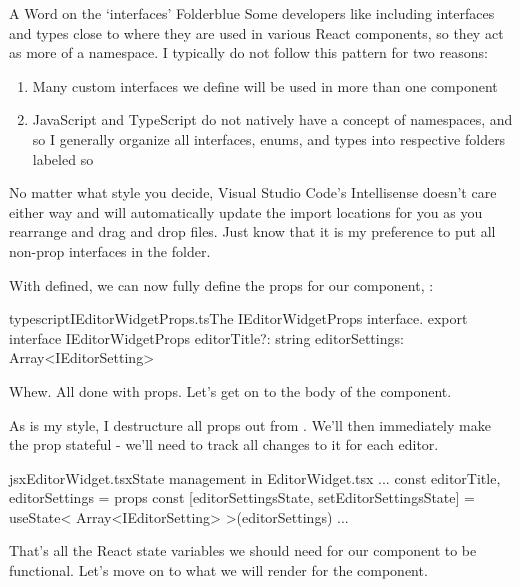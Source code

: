 \documentclass[paper=6in:9in,pagesize=pdftex,headinclude=on,footinclude=on,12pt,twoside]{scrbook}
\begin{document}
\begin{highlightBox}{A Word on the `interfaces' Folder}{blue}{\information}
Some developers like including interfaces and types close to where they are used in various React components, so they act as more of a namespace. I typically do not follow this pattern for two reasons:

\begin{enumerate}
  \item Many custom interfaces we define will be used in more than one component
  \item JavaScript and TypeScript do not natively have a concept of namespaces, and so I generally organize all interfaces, enums, and types into respective folders labeled so
\end{enumerate}

No matter what style you decide, Visual Studio Code's Intellisense doesn't care either way and will automatically update the import locations for you as you rearrange and drag and drop files. Just know that it is my preference to put all non-prop interfaces in the  folder.
\end{highlightBox}

With  defined, we can now fully define the props for our component, :

\begin{codeInput}{typescript}{IEditorWidgetProps.ts}{The IEditorWidgetProps interface.}
export interface IEditorWidgetProps {
  editorTitle?: string
  editorSettings: Array<IEditorSetting>
}
\end{codeInput}

Whew. All done with props. Let's get on to the body of the component.


As is my style, I destructure all props out from . We'll then immediately make the  prop stateful - we'll need to track all changes to it for each editor.

\begin{codeInput}{jsx}{EditorWidget.tsx}{State management in EditorWidget.tsx}
...
const { editorTitle, editorSettings } = props
const [editorSettingsState, setEditorSettingsState] = useState<
  Array<IEditorSetting>
>(editorSettings)
...
\end{codeInput}

That's all the React state variables we should need for our component to be functional. Let's move on to what we will render for the component.
\end{document}
